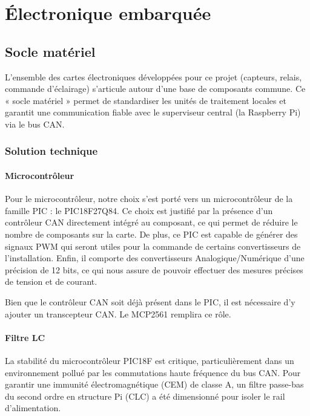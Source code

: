 \chapter{Électronique embarquée}

    \section{Socle matériel}
        L'ensemble des cartes électroniques développées pour ce projet (capteurs, relais, commande d'éclairage) s'articule autour d'une base de composants commune. Ce « socle matériel » permet de standardiser les unités de traitement locales et garantit une communication fiable avec le superviseur central (la Raspberry Pi) via le bus CAN.

        \subsection{Solution technique}
            \subsubsection{Microcontrôleur}
            Pour le microcontrôleur, notre choix s'est porté vers un microcontrôleur de la famille PIC : le PIC18F27Q84. Ce choix est justifié par la présence d'un contrôleur CAN directement intégré au composant, ce qui permet de réduire le nombre de composants sur la carte. De plus, ce PIC est capable de générer des signaux PWM qui seront utiles pour la commande de certains convertisseurs de l'installation. Enfin, il comporte des convertisseurs Analogique/Numérique d'une précision de 12 bits, ce qui nous assure de pouvoir effectuer des mesures précises de tension et de courant.

            Bien que le contrôleur CAN soit déjà présent dans le PIC, il est nécessaire d'y ajouter un transcepteur CAN. Le MCP2561 remplira ce rôle.

            \subsubsection{Filtre LC}
            La stabilité du microcontrôleur PIC18F est critique, particulièrement dans un environnement pollué par les commutations haute fréquence du bus CAN. Pour garantir une immunité électromagnétique (CEM) de classe A, un filtre passe-bas du second ordre en structure Pi (CLC) a été dimensionné pour isoler le rail d'alimentation.

